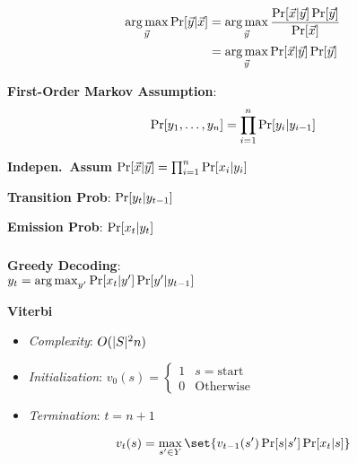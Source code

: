 \documentclass[9pt]{extarticle}
\renewcommand{\green}[1]{{\color{ForestGreen} #1}}
\newcommand{\greenbf}[1]{\textbf{\green{#1}}}
\begin{document}
\begin{multicols}{3}
  \subsection*{}

  \begin{align*}
    \operatorname*{arg\,max}_{\vec{y}} \Pr\lbrack\vec{y} \vert \vec{x}\rbrack &= \operatorname*{arg\,max}_{\vec{y}} \frac{\Pr\lbrack\vec{x} \vert \vec{y}\rbrack\Pr[\vec{y}]}{\Pr[\vec{x}]} \\
                                                        &= \operatorname*{arg\,max}_{\vec{y}} \Pr\lbrack\vec{x} \vert \vec{y}\rbrack \Pr[\vec{y}]
  \end{align*}

  \greenbf{First-Order Markov Assumption}:
  \begin{equation*}
    \Pr\lbrack y_{1},\ldots,y_{n}\rbrack = \prod_{i=1}^{n} \Pr[y_{i} \vert y_{i-1}]
  \end{equation*}

  \greenbf{Indepen.\ Assum} $\Pr\lbrack\vec{x} \vert \vec{y}\rbrack = \prod_{i=1}^{n} \Pr[x_{i} \vert y_{i}]$

  \greenbf{Transition Prob}: $\Pr\lbrack y_{t} \vert y_{t-1}\rbrack$

  \greenbf{Emission Prob}: $\Pr\lbrack x_{t} \vert y_{t}\rbrack$

  \subsubsection*{}

  \greenbf{Greedy Decoding}: \\${y_t = \operatorname*{arg\,max}_{y'} \Pr[x_t \vert y'] \Pr[y' \vert y_{t-1}]}$

  \greenbf{Viterbi}
  \begin{itemize}
    \item \textit{Complexity}: $O(\lvert S\rvert^{2} n)$
    \item \textit{Initialization}: $v_0(s) = \begin{cases}
                                               1 & s = \text{start} \\
                                               0 & \text{Otherwise}
                                             \end{cases}$
    \item \textit{Termination}: $t = n+1$
  \end{itemize}

  \begin{equation*}
    v_{t}(s) = \max_{s' \in Y}\set{v_{t-1}(s') \Pr[s \vert s'] \Pr[x_t \vert s]}
  \end{equation*}


\end{multicols}
\end{document}
